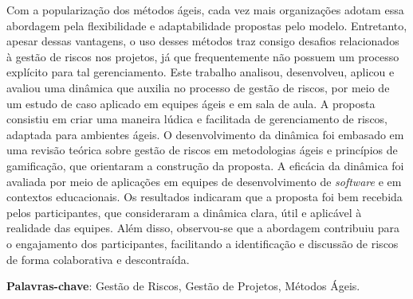 \documentclass[
	12pt,
	openright,
	twoside,
	a4paper,
	english,
	brazil
	]{abntex2}
\begin{document}
\frenchspacing


\imprimircapa


\imprimirfolhaderosto*


\setlength{\absparsep}{18pt}
\begin{resumo}
  Com a popularização dos métodos ágeis, cada vez mais organizações adotam essa abordagem pela flexibilidade e adaptabilidade propostas pelo modelo. Entretanto, apesar dessas vantagens, o uso desses métodos traz consigo desafios relacionados à gestão de riscos nos projetos, já que frequentemente não possuem um processo explícito para tal gerenciamento.
  Este trabalho analisou, desenvolveu, aplicou e avaliou uma dinâmica que auxilia no processo de gestão de riscos, por meio de um estudo de caso aplicado em equipes ágeis e em sala de aula. A proposta consistiu em criar uma maneira lúdica e facilitada de gerenciamento de riscos, adaptada para ambientes ágeis.
  O desenvolvimento da dinâmica foi embasado em uma revisão teórica sobre gestão de riscos em metodologias ágeis e princípios de gamificação, que orientaram a construção da proposta. A eficácia da dinâmica foi avaliada por meio de aplicações em equipes de desenvolvimento de \textit{software} e em contextos educacionais.
  Os resultados indicaram que a proposta foi bem recebida pelos participantes, que consideraram a dinâmica clara, útil e aplicável à realidade das equipes. Além disso, observou-se que a abordagem contribuiu para o engajamento dos participantes, facilitando a identificação e discussão de riscos de forma colaborativa e descontraída.
  \vspace{\onelineskip}

  \noindent\textbf{Palavras-chave}: Gestão de Riscos, Gestão de Projetos, Métodos Ágeis.

\end{resumo}

\end{document}

